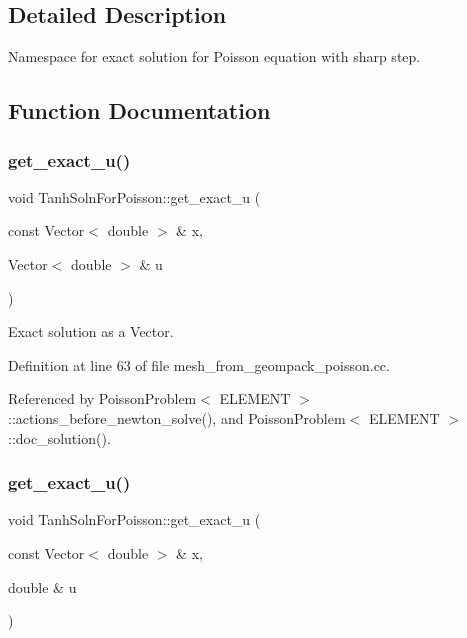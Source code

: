 \subsection{Detailed Description}
Namespace for exact solution for Poisson equation with sharp step. 

\subsection{Function Documentation}
\mbox{\label{namespaceTanhSolnForPoisson_af7896e9c18ce6438c73ae2a875e8b7de}} 
\subsubsection{\texorpdfstring{get\+\_\+exact\+\_\+u()}{get\_exact\_u()}\hspace{0.1cm}{\footnotesize\ttfamily [1/2]}}
{\footnotesize\ttfamily void Tanh\+Soln\+For\+Poisson\+::get\+\_\+exact\+\_\+u (\begin{DoxyParamCaption}\item[{const Vector$<$ double $>$ \&}]{x,  }\item[{Vector$<$ double $>$ \&}]{u }\end{DoxyParamCaption})}



Exact solution as a Vector. 



Definition at line 63 of file mesh\+\_\+from\+\_\+geompack\+\_\+poisson.\+cc.



Referenced by Poisson\+Problem$<$ E\+L\+E\+M\+E\+N\+T $>$\+::actions\+\_\+before\+\_\+newton\+\_\+solve(), and Poisson\+Problem$<$ E\+L\+E\+M\+E\+N\+T $>$\+::doc\+\_\+solution().

\mbox{\label{namespaceTanhSolnForPoisson_af197decab980d38d2037032780723984}} 
\subsubsection{\texorpdfstring{get\+\_\+exact\+\_\+u()}{get\_exact\_u()}\hspace{0.1cm}{\footnotesize\ttfamily [2/2]}}
{\footnotesize\ttfamily void Tanh\+Soln\+For\+Poisson\+::get\+\_\+exact\+\_\+u (\begin{DoxyParamCaption}\item[{const Vector$<$ double $>$ \&}]{x,  }\item[{double \&}]{u }\end{DoxyParamCaption})}



